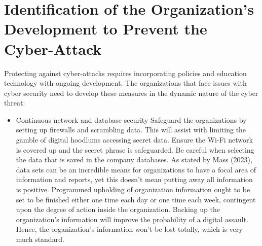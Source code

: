 \section{Identification of the Organization's Development to Prevent the Cyber-Attack}
\label{sec:into_back} 
Protecting against cyber-attacks requires incorporating policies and education technology with 
ongoing development. The organizations that face issues with cyber security
need to develop these measures in the dynamic nature of the cyber threat:
\begin{itemize}
    \item Continuous network and database security
Safeguard the organizations by setting up firewalls and scrambling data. This will assist with 
limiting the gamble of digital hoodlums accessing secret data. Ensure the Wi-Fi network is 
covered up and the secret phrase is safeguarded. Be careful when selecting the data that is 
saved in the company databases. As stated by Mass (2023), data sets can be an incredible means 
for organizations to have a focal area of information and reports, yet this doesn't mean 
putting away all information is positive. Programmed upholding of organization information 
ought to be set to be finished either one time each day or one time each week, contingent upon 
the degree of action inside the organization. Backing up the organization's information will 
improve the probability of a digital assault. Hence, the organization's information won't be 
lost totally, which is very much standard.


\end{itemize}
